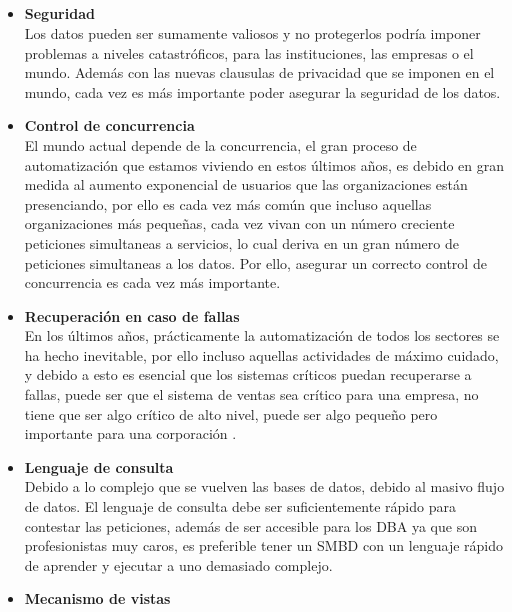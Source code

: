 \documentclass{article}
\begin{document}
    \subsection{}
    \begin{itemize}
        \item \textbf{Seguridad}
        \\Los datos pueden ser sumamente valiosos y no protegerlos podría imponer problemas a niveles catastróficos, para las instituciones, las empresas o el mundo. Además con las nuevas clausulas de privacidad que se imponen en el mundo, cada vez es más importante poder asegurar la seguridad de los datos.
        \item\textbf{Control de concurrencia}
        \\El mundo actual depende de la concurrencia, el gran proceso de automatización que estamos viviendo en estos últimos años, es debido en gran medida al aumento exponencial de usuarios que las organizaciones están presenciando, por ello es cada vez más común que incluso aquellas organizaciones más pequeñas, cada vez vivan con un número creciente peticiones simultaneas a servicios, lo cual deriva en un gran número de peticiones simultaneas a los datos. Por ello, asegurar un correcto control de concurrencia es cada vez más importante.\\
        \item \textbf{Recuperación en caso de fallas}
        \\En los últimos años, prácticamente la automatización de todos los sectores se ha hecho inevitable, por ello incluso aquellas actividades de máximo cuidado, y debido a esto es esencial que los sistemas críticos puedan recuperarse a fallas, puede ser que el sistema de ventas sea crítico para una empresa, no tiene que ser algo crítico de alto nivel, puede ser algo pequeño pero importante para una corporación .\\
        \item\textbf{Lenguaje de consulta} \\
        Debido a lo complejo que se vuelven las bases de datos, debido al masivo flujo de datos. El lenguaje de consulta debe ser suficientemente rápido para contestar las peticiones, además de ser accesible para los DBA ya que son profesionistas muy caros, es preferible tener un SMBD con un lenguaje rápido de aprender y ejecutar a uno demasiado complejo.\\
        \item\textbf{ Mecanismo de vistas} \\

\end{itemize}
\end{document}
